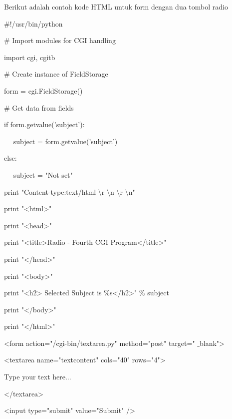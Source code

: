 \begin {enumerate}
\begin {enumerate}
\noindent
Berikut adalah contoh kode HTML untuk form dengan dua tombol radio  \par
\vspace{12pt}
\vspace{12pt}
\noindent
 $  \#  $!/usr/bin/python \par
\vspace{12pt}
\noindent
 $  \#  $ Import modules for CGI handling  \par
\noindent
import cgi, cgitb  \par
\vspace{12pt}
\noindent
 $  \#  $ Create instance of FieldStorage  \par
\noindent
form = cgi.FieldStorage()  \par
\vspace{12pt}
\noindent
 $  \#  $ Get data from fields \par
\noindent
if form.getvalue('subject'): \par
\noindent
~~ subject = form.getvalue('subject') \par
\noindent
else: \par
\noindent
~~ subject = "Not set" \par
\vspace{12pt}
\noindent
print "Content-type:text/html $  \setminus  $r $  \setminus  $n $  \setminus  $r $  \setminus  $n" \par
\noindent
print "<html>" \par
\noindent
print "<head>" \par
\noindent
print "<title>Radio - Fourth CGI Program</title>" \par
\noindent
print "</head>" \par
\noindent
print "<body>" \par
\noindent
print "<h2> Selected Subject is  $  \%  $s</h2>"  $  \%  $ subject \par
\noindent
print "</body>" \par
\noindent
print "</html>" \par
\vspace{12pt}
\noindent
<form action="/cgi-bin/textarea.py" method="post" target=" $  \_  $blank"> \par
\noindent
<textarea name="textcontent" cols="40" rows="4"> \par
\noindent
Type your text here... \par
\noindent
</textarea> \par
\noindent
<input type="submit" value="Submit" /> \par

\end{enumerate}
\end{enumerate}
